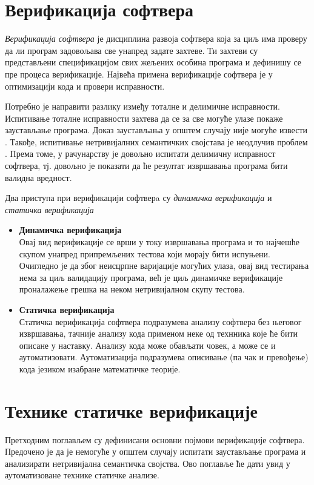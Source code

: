 \documentclass[a4paper]{article}
\begin{document}
{\section{Верификација софтвера}

\emph{Верификација софтвера} је дисциплина развоја софтвера која за циљ има проверу да ли програм задовољава све унапред задате захтеве. Ти захтеви су представљени спецификацијом свих жељених особина програма и дефинишу се пре процеса верификације. Највећа примена верификације софтвера је у оптимизацији кода и провери исправности.


Потребно је направити разлику између тоталне и делимичне исправности. Испитивање тоталне исправности захтева да се за све могуће улазе покаже заустављање програма. Доказ заустављања у општем случају није могуће извести \cite{turing}. Такође, испитивање нетривијалних семантичких својстава је неодлучив проблем \cite{rice}. Према томе, у рачунарству је довољно испитати делимичну исправност софтвера, тј. довољно је показати да ће резултат извршавања програма бити валидна вредност.


Два приступа при верификацији софтверa су \emph{динамичка верификација} и \emph{статичка верификација} \cite{milena} 
\begin{itemize}
\item \textbf{Динамичка верификација}\\
Овај вид верификације се врши у току извршавања програма и то најчешће скупом 
унапред припремљених тестова који морају бити испуњени. Очигледно је да због неисцрпне варијације могућих улаза, овај вид тестирања нема за циљ валидацију програма, већ је циљ динамичке верификације проналажење грешка на неком нетривијалном скупу тестова.
\item \textbf{Статичка верификација}\\
Статичка верификација софтвера подразумева анализу софтвера без његовог извршавања, тачније анализу кода применом неке од технника које ће бити описане у наставку. Анализу кода може обављати човек, а може се и аутоматизовати. Аутоматизација подразумева описивање (па чак и превођење) кода језиком изабране математичке теорије.
\end{itemize}


\section{Технике статичке верификације}
Претходним поглављем су дефинисани основни појмови верификације софтвера. Предочено је да је немогуће у општем случају испитати заустављање програма и анализирати нетривијална семантичка својства. Ово поглавље ће дати увид у аутоматизоване технике статичке анализе.

}
\end{document}
